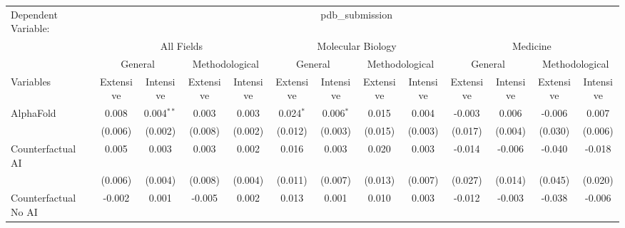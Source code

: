 \begingroup
\centering
\begin{tabular}{lcccccccccccc}
   \tabularnewline \midrule \midrule
   Dependent Variable: & \multicolumn{12}{c}{pdb\_submission}\\
 & \multicolumn{4}{c}{All Fields} & \multicolumn{4}{c}{Molecular Biology} & \multicolumn{4}{c}{Medicine} \\
\cmidrule(lr){2-5} \cmidrule(lr){6-9} \cmidrule(lr){10-13}
 & \multicolumn{2}{c}{General} & \multicolumn{2}{c}{Methodological} & \multicolumn{2}{c}{General} & \multicolumn{2}{c}{Methodological} & \multicolumn{2}{c}{General} & \multicolumn{2}{c}{Methodological} \\
\cmidrule(lr){2-3} \cmidrule(lr){4-5} \cmidrule(lr){6-7} \cmidrule(lr){8-9} \cmidrule(lr){10-11} \cmidrule(lr){12-13}
Variables & \multicolumn{1}{c}{Extensive} & \multicolumn{1}{c}{Intensive} & \multicolumn{1}{c}{Extensive} & \multicolumn{1}{c}{Intensive} & \multicolumn{1}{c}{Extensive} & \multicolumn{1}{c}{Intensive} & \multicolumn{1}{c}{Extensive} & \multicolumn{1}{c}{Intensive} & \multicolumn{1}{c}{Extensive} & \multicolumn{1}{c}{Intensive} & \multicolumn{1}{c}{Extensive} & \multicolumn{1}{c}{Intensive} \\
\cmidrule(lr){1-1}\cmidrule(lr){2-2} \cmidrule(lr){3-3} \cmidrule(lr){4-4} \cmidrule(lr){5-5} \cmidrule(lr){6-6} \cmidrule(lr){7-7} \cmidrule(lr){8-8} \cmidrule(lr){9-9} \cmidrule(lr){10-10} \cmidrule(lr){11-11} \cmidrule(lr){12-12} \cmidrule(lr){13-13}
   AlphaFold                                & 0.008   & 0.004$^{**}$ & 0.003   & 0.003   & 0.024$^{*}$ & 0.006$^{*}$ & 0.015   & 0.004    & -0.003  & 0.006   & -0.006  & 0.007\\   
                                            & (0.006) & (0.002)      & (0.008) & (0.002) & (0.012)     & (0.003)     & (0.015) & (0.003)  & (0.017) & (0.004) & (0.030) & (0.006)\\   
   Counterfactual AI                        & 0.005   & 0.003        & 0.003   & 0.002   & 0.016       & 0.003       & 0.020   & 0.003    & -0.014  & -0.006  & -0.040  & -0.018\\   
                                            & (0.006) & (0.004)      & (0.008) & (0.004) & (0.011)     & (0.007)     & (0.013) & (0.007)  & (0.027) & (0.014) & (0.045) & (0.020)\\   
   Counterfactual No AI                     & -0.002  & 0.001        & -0.005  & 0.002   & 0.013       & 0.001       & 0.010   & 0.003    & -0.012  & -0.003  & -0.038  & -0.006\\   

\end{tabular}
